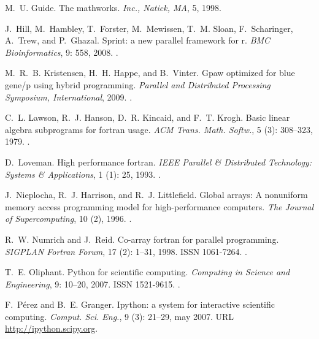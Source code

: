 \documentclass{sigplanconf}
\begin{document}
\begin{thebibliography}{18}
M.~U. Guide.
\newblock The mathworks.
\newblock \emph{Inc., Natick, MA}, 5, 1998.

J.~Hill, M.~Hambley, T.~Forster, M.~Mewissen, T.~M. Sloan, F.~Scharinger,
  A.~Trew, and P.~Ghazal.
\newblock Sprint: a new parallel framework for r.
\newblock \emph{BMC Bioinformatics}, 9: 558, 2008.
\newblock {}.

M.~R.~B. Kristensen, H.~H. Happe, and B.~Vinter.
\newblock Gpaw optimized for blue gene/p using hybrid programming.
\newblock \emph{Parallel and Distributed Processing Symposium, International},
  2009.
\newblock {}.

C.~L. Lawson, R.~J. Hanson, D.~R. Kincaid, and F.~T. Krogh.
\newblock Basic linear algebra subprograms for fortran usage.
\newblock \emph{ACM Trans. Math. Softw.}, 5 (3): 308--323,
  1979.
\newblock {}.

D.~Loveman.
\newblock High performance fortran.
\newblock \emph{IEEE Parallel \& Distributed Technology: Systems \&
  Applications}, 1 (1): 25, 1993.
\newblock {}.

J.~Nieplocha, R.~J. Harrison, and R.~J. Littlefield.
\newblock Global arrays: A nonuniform memory access programming model for
  high-performance computers.
\newblock \emph{The Journal of Supercomputing}, 10 (2), 1996.
\newblock {}.

R.~W. Numrich and J.~Reid.
\newblock Co-array fortran for parallel programming.
\newblock \emph{SIGPLAN Fortran Forum}, 17 (2): 1--31, 1998.
\newblock ISSN 1061-7264.
\newblock {}.

T.~E. Oliphant.
\newblock Python for scientific computing.
\newblock \emph{Computing in Science and Engineering}, 9: 10--20,
  2007.
\newblock ISSN 1521-9615.
\newblock {}.

F.~P{\'{e}}rez and B.~E. Granger.
\newblock Ipython: a system for interactive scientific computing.
\newblock \emph{Comput. Sci. Eng.}, 9 (3): 21--29, may 2007.
\newblock URL \url{http://ipython.scipy.org}.


\end{thebibliography}
\end{document}

